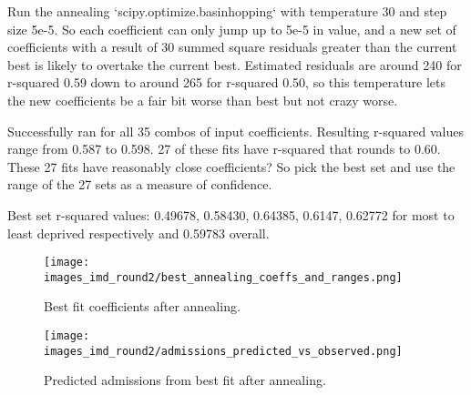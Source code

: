 \documentclass[12pt]{extarticle}
\begin{document}
Run the annealing `scipy.optimize.basinhopping` with temperature 30 and step size 5e-5. So each coefficient can only jump up to 5e-5 in value, and a new set of coefficients with a result of 30 summed square residuals greater than the current best is likely to overtake the current best. Estimated residuals are around 240 for r-squared 0.59 down to around 265 for r-squared 0.50, so this temperature lets the new coefficients be a fair bit worse than best but not crazy worse.

Successfully ran for all 35 combos of input coefficients. Resulting r-squared values range from 0.587 to 0.598.
27 of these fits have r-squared that rounds to 0.60. 
These 27 fits have reasonably close coefficients?
So pick the best set and use the range of the 27 sets as a measure of confidence.

Best set r-squared values: 0.49678, 0.58430, 0.64385, 0.6147, 0.62772 for most to least deprived respectively and 0.59783 overall.

\begin{figure}
    \centering
    \texttt{[image: images\_imd\_round2/best\_annealing\_coeffs\_and\_ranges.png]}
    \caption{Best fit coefficients after annealing.}
    \label{fig:best_coeffs_and_range}
\end{figure}



\begin{figure}
    \centering
    \texttt{[image: images\_imd\_round2/admissions\_predicted\_vs\_observed.png]}
    \caption{Predicted admissions from best fit after annealing.}
    \label{fig:scatter_admissions_annealing}
\end{figure}
\end{document}
